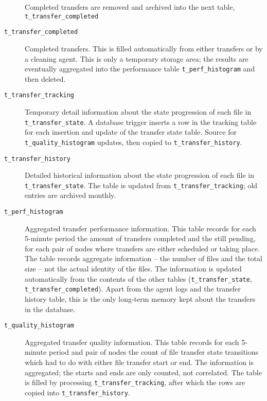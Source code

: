 \documentclass{cmspaper}
\begin{document}
\begin{description}
    Completed transfers are removed and archived into the next
    table, \texttt{t\_transfer\_completed}

  \item [\texttt{t\_transfer\_completed}]\mbox{}

    Completed transfers.  This is filled automatically from either
    transfers or by a cleaning agent.  This is only a temporary
    storage area; the results are eventually aggregated into the
    performance table \texttt{t\_perf\_histogram} and then deleted.

  \item [\texttt{t\_transfer\_tracking}]\mbox{}

    Temporary detail information about the state progression of each
    file in \texttt{t\_transfer\_state}.  A database trigger inserts
    a row in the tracking table for each insertion and update of the
    transfer state table.  Source for \texttt{t\_quality\_histogram}
    updates, then copied to \texttt{t\_transfer\_history}.

  \item [\texttt{t\_transfer\_history}]\mbox{}

    Detailed historical information about the state progression of
    each file in \texttt{t\_transfer\_state}.  The table is updated
    from \texttt{t\_transfer\_tracking}; old entries are archived
    monthly.

  \item [\texttt{t\_perf\_histogram}]\mbox{}

    Aggregated transfer performance information.  This table records
    for each 5-minute period the amount of transfers completed and
    the still pending, for each pair of nodes where transfers are
    either scheduled or taking place.  The table records aggregate
    information -- the number of files and the total size -- not
    the actual identity of the files.  The information is updated
    automatically from the contents of the other tables
    (\texttt{t\_transfer\_state}, \texttt{t\_transfer\_completed}).
    Apart from the agent logs and the transfer history table, this
    is the only long-term memory kept about the transfers in the
    database.

  \item [\texttt{t\_quality\_histogram}]\mbox{}

    Aggregated transfer quality information.  This table records
    for each 5-minute period and pair of nodes the count of file
    transfer state transitions which had to do with either file
    transfer start or end.  The information is aggregated; the
    starts and ends are only counted, not correlated.  The table
    is filled by processing \texttt{t\_transfer\_tracking}, after
    which the rows are copied into \texttt{t\_transfer\_history}.


\end{description}
\end{document}
